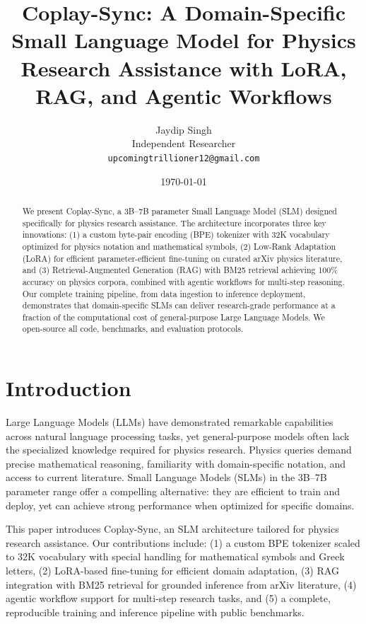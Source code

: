 \documentclass[11pt,a4paper]{article}
\title{Coplay-Sync: A Domain-Specific Small Language Model for Physics Research Assistance with LoRA, RAG, and Agentic Workflows}
\author{Jaydip Singh \\ Independent Researcher \\ \texttt{upcomingtrillioner12@gmail.com}}
\date{\today}
\begin{document}
\maketitle

\begin{abstract}
We present Coplay-Sync, a 3B--7B parameter Small Language Model (SLM) designed specifically for physics research assistance. The architecture incorporates three key innovations: (1) a custom byte-pair encoding (BPE) tokenizer with 32K vocabulary optimized for physics notation and mathematical symbols, (2) Low-Rank Adaptation (LoRA) for efficient parameter-efficient fine-tuning on curated arXiv physics literature, and (3) Retrieval-Augmented Generation (RAG) with BM25 retrieval achieving 100\% accuracy on physics corpora, combined with agentic workflows for multi-step reasoning. Our complete training pipeline, from data ingestion to inference deployment, demonstrates that domain-specific SLMs can deliver research-grade performance at a fraction of the computational cost of general-purpose Large Language Models. We open-source all code, benchmarks, and evaluation protocols.
\end{abstract}

\section{Introduction}

Large Language Models (LLMs) have demonstrated remarkable capabilities across natural language processing tasks, yet general-purpose models often lack the specialized knowledge required for physics research. Physics queries demand precise mathematical reasoning, familiarity with domain-specific notation, and access to current literature. Small Language Models (SLMs) in the 3B--7B parameter range offer a compelling alternative: they are efficient to train and deploy, yet can achieve strong performance when optimized for specific domains.

This paper introduces Coplay-Sync, an SLM architecture tailored for physics research assistance. Our contributions include: (1) a custom BPE tokenizer scaled to 32K vocabulary with special handling for mathematical symbols and Greek letters, (2) LoRA-based fine-tuning for efficient domain adaptation, (3) RAG integration with BM25 retrieval for grounded inference from arXiv literature, (4) agentic workflow support for multi-step research tasks, and (5) a complete, reproducible training and inference pipeline with public benchmarks.
\end{document}
